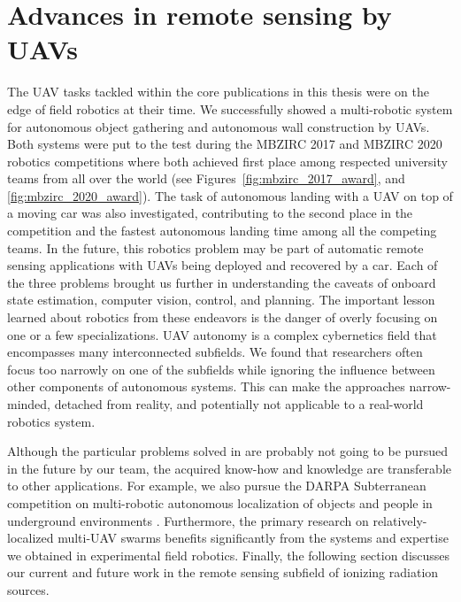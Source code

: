 \documentclass[a4paper,11pt,twoside,openright]{book}
\begin{document}


\section{Advances in remote sensing by UAVs}

The \ac{UAV} tasks tackled within the core publications in this thesis were on the edge of field robotics at their time.
We successfully showed a multi-robotic system for autonomous object gathering \cite{spurny2019cooperative} and autonomous wall construction \cite{baca2020autonomous} by \acp{UAV}.
Both systems were put to the test during the \ac{MBZIRC} 2017 and \ac{MBZIRC} 2020 robotics competitions where both achieved first place among respected university teams from all over the world (see Figures~\ref{fig:mbzirc_2017_award}, and \ref{fig:mbzirc_2020_award}).
The task of autonomous landing with a \ac{UAV} on top of a moving car \cite{baca2019autonomous} was also investigated, contributing to the second place in the competition and the fastest autonomous landing time among all the competing teams.
In the future, this robotics problem may be part of automatic remote sensing applications with \acp{UAV} being deployed and recovered by a car.
Each of the three problems brought us further in understanding the caveats of onboard state estimation, computer vision, control, and planning.
The important lesson learned about robotics from these endeavors is the danger of overly focusing on one or a few specializations.
\ac{UAV} autonomy is a complex cybernetics field that encompasses many interconnected subfields.
We found that researchers often focus too narrowly on one of the subfields while ignoring the influence between other components of autonomous systems.
This can make the approaches narrow-minded, detached from reality, and potentially not applicable to a real-world robotics system.

Although the particular problems solved in \cite{baca2019autonomous, spurny2019cooperative, baca2020autonomous} are probably not going to be pursued in the future by our team, the acquired know-how and knowledge are transferable to other applications.
For example, we also pursue the \ac{DARPA} Subterranean competition on multi-robotic autonomous localization of objects and people in underground environments \cite{roucek2019darpa, kratky2020autonomous2, petrlik2020robust}.
Furthermore, the primary research on relatively-localized multi-\ac{UAV} swarms \cite{petracek2020bioinspired, saska2020formation, ahmad2020autonomous, dmytruk2020safe} benefits significantly from the systems and expertise we obtained in experimental field robotics.
Finally, the following section discusses our current and future work in the remote sensing subfield of ionizing radiation sources.
\end{document}
